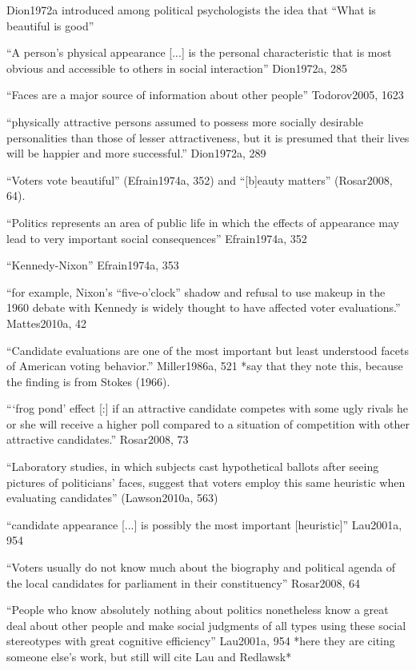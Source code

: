 Dion1972a introduced among political psychologists the idea that ``What is beautiful is good''

``A person's physical appearance [...] is the personal characteristic that is most obvious and accessible to others in social interaction'' Dion1972a, 285

``Faces are a major source of information about other people'' Todorov2005, 1623

``physically attractive persons assumed to possess more socially desirable personalities than those of lesser attractiveness, but it is presumed that their lives will be happier and more successful.'' Dion1972a, 289

``Voters vote beautiful'' (Efrain1974a, 352) and ``[b]eauty matters'' (Rosar2008, 64).

``Politics represents an area of public life in which the effects of appearance may lead to very important social consequences'' Efrain1974a, 352


		``Kennedy-Nixon'' Efrain1974a, 353

		``for example, Nixon’s “five-o’clock” shadow and refusal to use makeup in the 1960 debate with Kennedy is widely thought to have affected voter evaluations.'' Mattes2010a, 42

``Candidate evaluations are one of the most important but least understood facets of American voting behavior.'' Miller1986a, 521 *say that they note this, because the finding is from Stokes (1966).

``‘frog pond’ effect [:] if an attractive candidate competes with some ugly rivals he or she will receive a higher poll compared to a situation of competition with other attractive candidates.'' Rosar2008, 73


``Laboratory studies, in which subjects cast hypothetical ballots after seeing pictures of politicians' faces, suggest that voters employ this same heuristic when evaluating candidates'' (Lawson2010a, 563)

``candidate appearance [...] is possibly the most important [heuristic]'' Lau2001a, 954

``Voters usually do not know much about the biography and political agenda of the local candidates for parliament in their constituency'' Rosar2008, 64

``People who know absolutely nothing about politics nonetheless know a great deal about other people and make social judgments of all types using these social stereotypes with great cognitive efficiency'' Lau2001a, 954 *here they are citing someone else's work, but still will cite Lau and Redlawsk*

